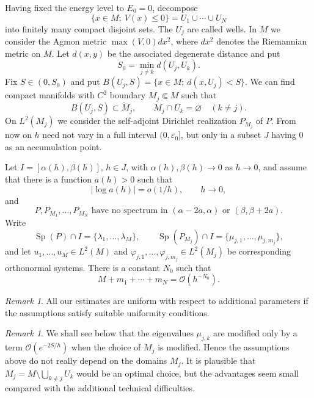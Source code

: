 \documentclass[11pt,a4paper]{article}
\newcommand{\Sp}{\operatorname{Sp}}
\newcommand{\cO}{\mathcal O}
\newcommand{\eps}{\varepsilon}
\numberwithin{equation}{section}
\theoremstyle{remark}
\newtheorem{remark}[theorem]{Remark}
\begin{document}
Having fixed the energy level to $E_0=0$, decompose
\[
\{x\in M;\ V(x)\le0\}=U_1\cup\cdots\cup U_N
\]
into finitely many compact disjoint sets. The $U_j$ are called wells. In $M$ we consider the Agmon metric $\max(V,0)dx^2$, where $dx^2$ denotes the Riemannian metric on $M$. Let $d(x,y)$ be the associated degenerate distance and put
\[
S_0=\min_{j\ne k}d(U_j,U_k).
\]
Fix $S\in(0,S_0)$ and put $B(U_j,S)=\{x\in M;\ d(x,U_j)<S\}$. We can find compact manifolds with $C^2$ boundary $M_j\Subset M$ such that
\begin{equation}
B(U_j,S)\subset\mathring M_j,\qquad M_j\cap U_k=\varnothing\quad(k\ne j).
\end{equation}
On $L^2(M_j)$ we consider the self-adjoint Dirichlet realization $P_{M_j}$ of $P$. From now on $h$ need not vary in a full interval $(0,\eps_0]$, but only in a subset $J$ having $0$ as an accumulation point.

Let $I=[\alpha(h),\beta(h)]$, $h\in J$, with $\alpha(h),\beta(h)\to0$ as $h\to0$, and assume that there is a function $a(h)>0$ such that
\begin{equation}
|\log a(h)|=o(1/h),\qquad h\to0,
\end{equation}
and
\begin{equation}
P,P_{M_1},\ldots,P_{M_N}\text{ have no spectrum in }(\alpha-2a,\alpha)\text{ or }(\beta,\beta+2a).
\end{equation}
Write
\[
\Sp(P)\cap I=\{\lambda_1,\ldots,\lambda_M\},\qquad
\Sp(P_{M_j})\cap I=\{\mu_{j,1},\ldots,\mu_{j,m_j}\},
\]
and let $u_1,\ldots,u_M\in L^2(M)$ and $\varphi_{j,1},\ldots,\varphi_{j,m_j}\in L^2(M_j)$ be corresponding orthonormal systems. There is a constant $N_0$ such that
\[
M+m_1+\cdots+m_N=\cO(h^{-N_0}).
\]

\begin{remark}
All our estimates are uniform with respect to additional parameters if the assumptions satisfy suitable uniformity conditions.
\end{remark}

\begin{remark}
We shall see below that the eigenvalues $\mu_{j,k}$ are modified only by a term $\cO(e^{-2S/h})$ when the choice of $M_j$ is modified. Hence the assumptions above do not really depend on the domains $M_j$. It is plausible that $M_j=M\setminus\bigcup_{k\ne j}U_k$ would be an optimal choice, but the advantages seem small compared with the additional technical difficulties.
\end{remark}
\end{document}
